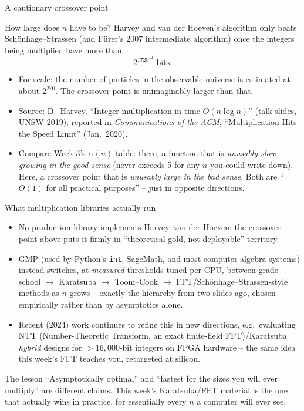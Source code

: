 \documentclass[11pt,aspectratio=169]{beamer}
\begin{document}
\begin{frame}{A cautionary crossover point}
  \begin{alertblock}{How large does $n$ have to be?}
    Harvey and van der Hoeven's algorithm only beats Schönhage--Strassen (and Fürer's
    2007 intermediate algorithm) once the integers being multiplied have more than
    \[
      2^{1729^{12}} \text{ bits.}
    \]
  \end{alertblock}
  \begin{itemize}
    \item For scale: the number of particles in the observable universe is estimated at
    about $2^{270}$. The crossover point is unimaginably larger than that.
    \item Source: D.\ Harvey, ``Integer multiplication in time $O(n\log n)$'' (talk
    slides, UNSW 2019); reported in \emph{Communications of the ACM}, ``Multiplication
    Hits the Speed Limit'' (Jan.\ 2020).
    \item Compare Week 3's $\alpha(n)$ table: there, a function that is \emph{unusably
    slow-growing in the good sense} (never exceeds 5 for any $n$ you could write down).
    Here, a crossover point that is \emph{unusably large in the bad sense}. Both are
    ``$O(1)$ for all practical purposes'' -- just in opposite directions.
  \end{itemize}
\end{frame}

\begin{frame}{What multiplication libraries actually run}
  \begin{itemize}
    \item No production library implements Harvey--van der Hoeven: the crossover point
    above puts it firmly in ``theoretical gold, not deployable'' territory.
    \item GMP (used by Python's \texttt{int}, SageMath, and most computer-algebra
    systems) instead switches, at \emph{measured} thresholds tuned per CPU, between
    grade-school $\to$ Karatsuba $\to$ Toom--Cook $\to$ FFT/Schönhage--Strassen-style
    methods as $n$ grows -- exactly the hierarchy from two slides ago, chosen
    empirically rather than by asymptotics alone.
    \item Recent (2024) work continues to refine this in new directions, e.g.\ evaluating
    NTT (Number-Theoretic Transform, an exact finite-field FFT)/Karatsuba \emph{hybrid}
    designs for $>16{,}000$-bit integers on FPGA hardware -- the same idea this week's FFT
    teaches you, retargeted at silicon.
  \end{itemize}
  \begin{exampleblock}{The lesson}
    ``Asymptotically optimal'' and ``fastest for the sizes you will ever multiply'' are
    different claims. This week's Karatsuba/FFT material is the one that actually wins in
    practice, for essentially every $n$ a computer will ever see.
  \end{exampleblock}
\end{frame}
\end{document}
